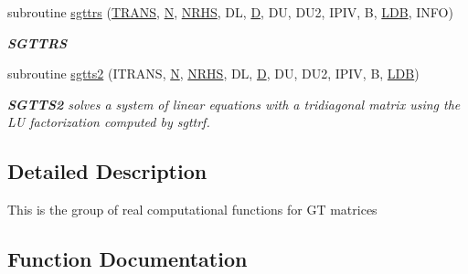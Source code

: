 \begin{DoxyCompactItemize}
subroutine \hyperlink{group__realGTcomputational_ga4c1f4f3382563a295c36917d658befb3}{sgttrs} (\hyperlink{superlu__enum__consts_8h_a0c4e17b2d5cea33f9991ccc6a6678d62a1f61e3015bfe0f0c2c3fda4c5a0cdf58}{T\+R\+A\+N\+S}, \hyperlink{polmisc_8c_a0240ac851181b84ac374872dc5434ee4}{N}, \hyperlink{example__user_8c_aa0138da002ce2a90360df2f521eb3198}{N\+R\+H\+S}, D\+L, \hyperlink{odrpack_8h_a7dae6ea403d00f3687f24a874e67d139}{D}, D\+U, D\+U2, I\+P\+I\+V, B, \hyperlink{example__user_8c_a50e90a7104df172b5a89a06c47fcca04}{L\+D\+B}, I\+N\+F\+O)
\begin{DoxyCompactList}\small\item\em {\bfseries S\+G\+T\+T\+R\+S} \end{DoxyCompactList}\item 
subroutine \hyperlink{group__realGTcomputational_ga913327540f64843e724055d28babf247}{sgtts2} (I\+T\+R\+A\+N\+S, \hyperlink{polmisc_8c_a0240ac851181b84ac374872dc5434ee4}{N}, \hyperlink{example__user_8c_aa0138da002ce2a90360df2f521eb3198}{N\+R\+H\+S}, D\+L, \hyperlink{odrpack_8h_a7dae6ea403d00f3687f24a874e67d139}{D}, D\+U, D\+U2, I\+P\+I\+V, B, \hyperlink{example__user_8c_a50e90a7104df172b5a89a06c47fcca04}{L\+D\+B})
\begin{DoxyCompactList}\small\item\em {\bfseries S\+G\+T\+T\+S2} solves a system of linear equations with a tridiagonal matrix using the L\+U factorization computed by sgttrf. \end{DoxyCompactList}\end{DoxyCompactItemize}


\subsection{Detailed Description}
This is the group of real computational functions for G\+T matrices 

\subsection{Function Documentation}
\hypertarget{group__realGTcomputational_ga9474585c30f5420fc243d0bd0e0e9c12}{}
